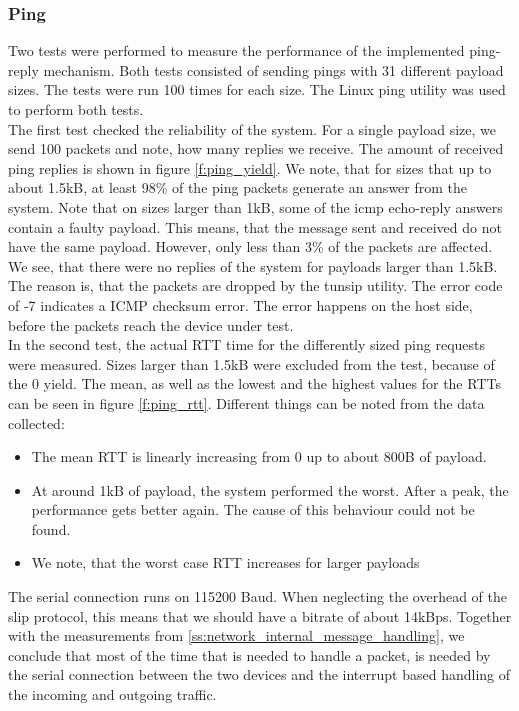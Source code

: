\subsubsection{Ping \label{ss:network_performance_ping}}
Two tests were performed to measure the performance of the implemented ping-reply mechanism. Both tests consisted of sending pings with 31 different payload sizes. The tests were run 100 times for each size. The Linux ping utility was used to perform both tests.\\
The first test checked the reliability of the system. For a single payload size, we send 100 packets and note, how many replies we receive. The amount of received ping replies is shown in figure \ref{f:ping_yield}. We note, that for sizes that up to about 1.5kB, at least 98\% of the ping packets generate an answer from the system. Note that on sizes larger than 1kB, some of the icmp echo-reply answers contain a faulty payload. This means, that the message sent and received do not have the same payload. However, only less than 3\% of the packets are affected. We see, that there were no replies of the system for payloads larger than 1.5kB. The reason is, that the packets are dropped by the tunsip utility. The error code of -7 indicates a ICMP checksum error. The error happens on the host side, before the packets reach the device under test.\\
In the second test, the actual RTT time for the differently sized ping requests were measured. Sizes larger than 1.5kB were excluded from the test, because of the 0 yield. The mean, as well as the lowest and the highest values for the RTTs can be seen in figure \ref{f:ping_rtt}. Different things can be noted from the data collected: 
\begin{itemize}
	\item The mean RTT is linearly increasing from 0 up to about 800B of payload.
	\item At around 1kB of payload, the system performed the worst. After a peak, the performance gets better again. The cause of this behaviour could not be found.
	\item We note, that the worst case RTT increases for larger payloads
\end{itemize}
The serial connection runs on 115200 Baud. When neglecting the overhead of the slip protocol, this means that we should have a bitrate of about 14kBps. Together with the measurements from \ref{ss:network_internal_message_handling}, we conclude that most of the time that is needed to handle a packet, is needed by the serial connection between the two devices and the interrupt based handling of the incoming and outgoing traffic. 


